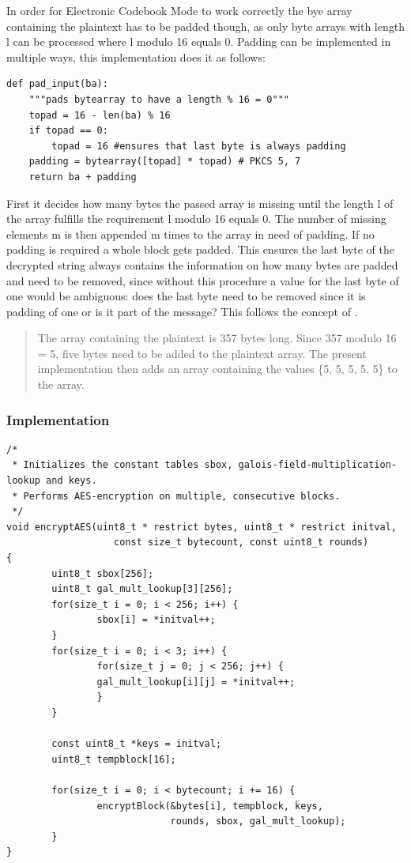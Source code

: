 In order for Electronic Codebook Mode to work correctly the bye array
containing the plaintext has to be padded though, as only byte arrays
with length l can be processed where l modulo 16 equals 0. Padding can
be implemented in multiple ways, this implementation does it as follows:

\begin{lstlisting}
def pad_input(ba):
    """pads bytearray to have a length % 16 = 0"""
    topad = 16 - len(ba) % 16
    if topad == 0:
        topad = 16 #ensures that last byte is always padding
    padding = bytearray([topad] * topad) # PKCS 5, 7
    return ba + padding
\end{lstlisting}

First it decides how many bytes the passed array is missing until the
length l of the array fulfills the requirement l modulo 16 equals 0. The
number of missing elements m is then appended m times to the array in
need of padding. If no padding is required a whole block gets padded.
This ensures the last byte of the decrypted string always contains the
information on how many bytes are padded and need to be removed, since
without this procedure a value for the last byte of one would be
ambiguous: does the last byte need to be removed since it is padding of
one or is it part of the message? This follows the concept of \cite[ch. 10.3 Note 2]{RFC2315}.

\begin{quote}
The array containing the plaintext is 357 bytes long. Since 357 modulo 16 = 5,
five bytes need to be added to the plaintext array. The present
implementation then adds an array containing the values \{5, 5, 5, 5,
5\} to the array.
\end{quote}

\hypertarget{implementation-6}{%
\subsubsection{Implementation}\label{implementation-6}}

\begin{lstlisting}
/*
 * Initializes the constant tables sbox, galois-field-multiplication-lookup and keys.
 * Performs AES-encryption on multiple, consecutive blocks.
 */
void encryptAES(uint8_t * restrict bytes, uint8_t * restrict initval, 
                   const size_t bytecount, const uint8_t rounds)
{   
        uint8_t sbox[256];
        uint8_t gal_mult_lookup[3][256];
        for(size_t i = 0; i < 256; i++) {
                sbox[i] = *initval++;
        }
        for(size_t i = 0; i < 3; i++) {
                for(size_t j = 0; j < 256; j++) {
                gal_mult_lookup[i][j] = *initval++;
                }
        }
        
        const uint8_t *keys = initval;
        uint8_t tempblock[16];
        
        for(size_t i = 0; i < bytecount; i += 16) {
                encryptBlock(&bytes[i], tempblock, keys, 
                             rounds, sbox, gal_mult_lookup);
        }
}
\end{lstlisting}

